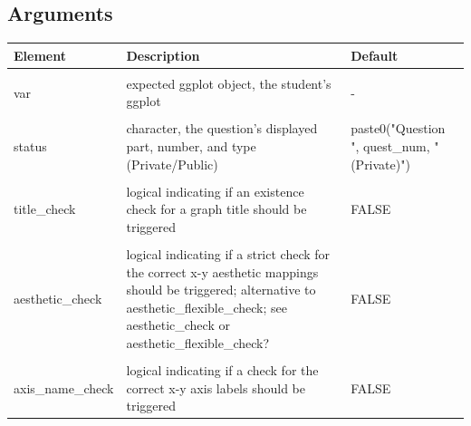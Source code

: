 \documentclass[
  12pt,
]{book}
\begin{document}
\subsection*{Arguments}\label{arguments-1}

\begin{longtable}{>{\raggedright\arraybackslash}p{4cm}>{\raggedright\arraybackslash}p{8cm}>{\raggedright\arraybackslash}p{4cm}}
\toprule
\textbf{Element} & \textbf{Description} & \textbf{Default}\\
\midrule
\cellcolor{gray!10}{var\_name} & \cellcolor{gray!10}{character, the expected name of var} & \cellcolor{gray!10}{-}\\
\hline
var & expected ggplot object, the student's ggplot & -\\
\hline
\cellcolor{gray!10}{var\_test} & \cellcolor{gray!10}{other ggplot object, the answer key's ggplot to be compared with var} & \cellcolor{gray!10}{-}\\
\hline
status & character, the question’s displayed part, number, and type (Private/Public) & paste0("Question ", quest\_num, " (Private)")\\
\hline
\cellcolor{gray!10}{prev\_check} & \cellcolor{gray!10}{logical indicating if the Prerequisite Check should be triggered; requires quest\_prev value and can optionally be combined with quest\_prev\_status} & \cellcolor{gray!10}{FALSE}\\
\hline
title\_check & logical indicating if an existence check for a graph title should be triggered & FALSE\\
\hline
\cellcolor{gray!10}{axis\_check} & \cellcolor{gray!10}{logical indicating if an existence check for the x-y axis labels should be triggered} & \cellcolor{gray!10}{FALSE}\\
\hline
aesthetic\_check & logical indicating if a strict check for the correct x-y aesthetic mappings should be triggered; alternative to aesthetic\_flexible\_check; see aesthetic\_check or aesthetic\_flexible\_check? & FALSE\\
\hline
\cellcolor{gray!10}{aesthetic\_flexible\_check} & \cellcolor{gray!10}{logical indicating if a flexible check for the correct x-y aesthetic mappings should be triggered; alternative to aesthetic\_check; see aesthetic\_check or aesthetic\_flexible\_check?} & \cellcolor{gray!10}{FALSE}\\
\hline
axis\_name\_check & logical indicating if a check for the correct x-y axis labels should be triggered & FALSE\\

\end{longtable}
\end{document}
